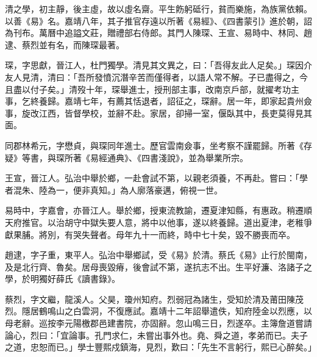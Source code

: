 \begin{pinyinscope}
清之學，初主靜，後主虛，故以虛名齋。平生飭躬砥行，貧而樂施，為族黨依賴。以善《易》名。嘉靖八年，其子推官存遠以所著《易經》、《四書蒙引》進於朝，詔為刊布。萬曆中追謚文莊，贈禮部右侍郎。其門人陳琛、王宣、易時中、林同、趙逮、蔡烈並有名，而陳琛最著。

琛，字思獻，晉江人，杜門獨學。清見其文異之，曰：「吾得友此人足矣。」琛因介友人見清，清曰：「吾所發憤沉潛辛苦而僅得者，以語人常不解。子已盡得之，今且盡以付子矣。」清歿十年，琛舉進士，授刑部主事，改南京戶部，就擢考功主事，乞終養歸。嘉靖七年，有薦其恬退者，詔征之，琛辭。居一年，即家起貴州僉事，旋改江西，皆督學校，並辭不赴。家居，卻掃一室，偃臥其中，長吏莫得見其面。

同郡林希元，字懋貞，與琛同年進士。歷官雲南僉事，坐考察不謹罷歸。所著《存疑》等書，與琛所著《易經通典》、《四書淺說》，並為舉業所宗。

王宣，晉江人。弘治中舉於鄉，一赴會試不第，以親老須養，不再赴。嘗曰：「學者混朱、陸為一，便非真知。」為人廓落豪邁，俯視一世。

易時中，字嘉會，亦晉江人。舉於鄉，授東流教諭，遷夏津知縣，有惠政。稍遷順天府推官。以治胡守中獄失要人意，將中以他事，遂以終養歸。道出夏津，老稚爭獻果脯。將別，有哭失聲者。母年九十一而終，時中七十矣，毀不勝喪而卒。

趙逮，字子重，東平人。弘治中舉鄉試，受《易》於清。蔡氏《易》止行於閩南，及是北行齊、魯矣。居母喪毀瘠，後會試不第，遂抗志不出。生平好濂、洛諸子之學，於明獨好薛氏《讀書錄》。

蔡烈，字文繼，龍溪人。父昊，瓊州知府。烈弱冠為諸生，受知於清及莆田陳茂烈。隱居鶴鳴山之白雲洞，不復應試。嘉靖十二年詔舉遣佚，知府陸金以烈應，以母老辭。巡按李元陽檄郡邑建書院，亦固辭。忽山鳴三日，烈遂卒。主簿詹道嘗請論心，烈曰：「宜論事。孔門求仁，未嘗出事外也。堯、舜之道，孝弟而已。夫子之道，忠恕而已。」學士豐熙戍鎮海，見烈，歎曰：「先生不言躬行，熙已心醉矣。」


\end{pinyinscope}
